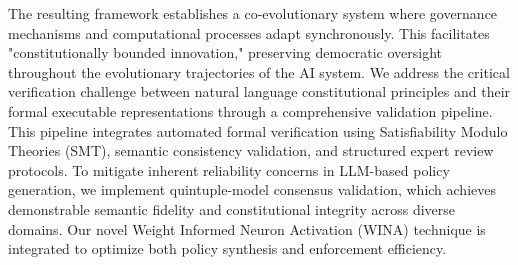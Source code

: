 \documentclass[manuscript,screen,review,anonymous,9pt]{acmart}
\begin{document}
The resulting framework establishes a co-evolutionary system where governance mechanisms and computational processes adapt synchronously. This facilitates "constitutionally bounded innovation," preserving democratic oversight throughout the evolutionary trajectories of the AI system. We address the critical verification challenge between natural language constitutional principles and their formal executable representations through a comprehensive validation pipeline. This pipeline integrates automated formal verification using Satisfiability Modulo Theories (SMT), semantic consistency validation, and structured expert review protocols. To mitigate inherent reliability concerns in LLM-based policy generation, we implement quintuple-model consensus validation, which achieves demonstrable semantic fidelity and constitutional integrity across diverse domains. Our novel Weight Informed Neuron Activation (WINA) technique \cite{WINA2024NeuronActivation} is integrated to optimize both policy synthesis and enforcement efficiency.
\end{document}
